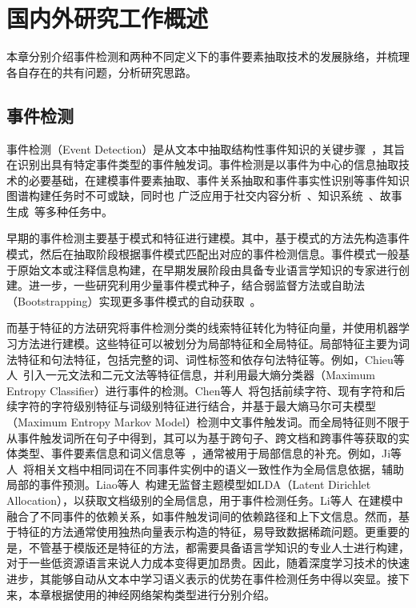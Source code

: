 \chapter{国内外研究工作概述}
\label{chap:recent_work}
本章分别介绍事件检测和两种不同定义下的事件要素抽取技术的发展脉络，并梳理各自存在的共有问题，分析研究思路。

\section{事件检测}
事件检测（Event Detection）是从文本中抽取结构性事件知识的关键步骤~\cite{grishman1997information,ahn2006stages}，其旨在识别出具有特定事件类型的事件触发词。事件检测是以事件为中心的信息抽取技术的必要基础，在建模事件要素抽取、事件关系抽取和事件事实性识别等事件知识图谱构建任务时不可或缺，同时也
广泛应用于社交内容分析~\cite{zhou2017event}、知识系统~\cite{li2020gaia,wen2021resin}、故事生成~\cite{li2022event}等多种任务中。

早期的事件检测主要基于模式和特征进行建模。其中，基于模式的方法先构造事件模式，然后在抽取阶段根据事件模式匹配出对应的事件检测信息。事件模式一般基于原始文本或注释信息构建，在早期发展阶段由具备专业语言学知识的专家进行创建。进一步，一些研究利用少量事件模式种子，结合弱监督方法或自助法（Bootstrapping）实现更多事件模式的自动获取~\cite{xu2006automatic,liao2010filtered,kilicoglu2011effective,cao2015improving2}。

而基于特征的方法研究将事件检测分类的线索特征转化为特征向量，并使用机器学习方法进行建模。这些特征可以被划分为局部特征和全局特征。局部特征主要为词法特征和句法特征，包括完整的词、词性标签和依存句法特征等。例如，Chieu等人~\cite{chieu2002maximum}引入一元文法和二元文法等特征信息，并利用最大熵分类器（Maximum Entropy
Classifier）进行事件的检测。Chen等人~\cite{chen2009language}将包括前续字符、现有字符和后续字符的字符级别特征与词级别特征进行结合，并基于最大熵马尔可夫模型（Maximum Entropy Markov Model）检测中文事件触发词。而全局特征则不限于从事件触发词所在句子中得到，其可以为基于跨句子、跨文档和跨事件等获取的实体类型、事件要素信息和词义信息等~\cite{ji2008refining,gupta2009predicting,liao2011acquiring,hong2011using,li2013joint,li2015improving}，通常被用于局部信息的补充。例如，Ji等人~\cite{ji2008refining}将相关文档中相同词在不同事件实例中的语义一致性作为全局信息依据，辅助局部的事件预测。Liao等人~\cite{liao2011acquiring}构建无监督主题模型如LDA（Latent Dirichlet Allocation），以获取文档级别的全局信息，用于事件检测任务。Li等人~\cite{li2013joint}在建模中融合了不同事件的依赖关系，如事件触发词间的依赖路径和上下文信息。然而，基于特征的方法通常使用独热向量表示构造的特征，易导致数据稀疏问题。更重要的是，不管基于模版还是特征的方法，都需要具备语言学知识的专业人士进行构建，对于一些低资源语言来说人力成本变得更加昂贵。因此，随着深度学习技术的快速进步，其能够自动从文本中学习语义表示的优势在事件检测任务中得以突显。接下来，本章根据使用的神经网络架构类型进行分别介绍。

